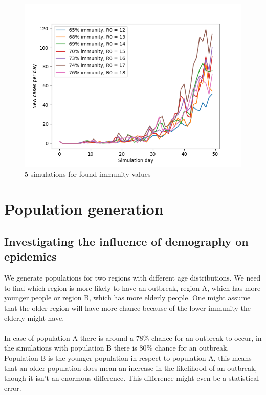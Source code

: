 \documentclass[runningheads]{llncs}
\begin{document}
\begin{figure}
	\includegraphics[width=\textwidth]{test_R0_final.png}
	\caption{5 simulations for found immunity values} 
\end{figure}

\newpage
\noindent
\section{Population generation}

\subsection{Investigating the influence of demography on epidemics}
We generate populations for two regions with different age distributions. We need to find which region is more likely to have an outbreak, region A, which has more younger people or region B, which has more elderly people. One might assume that the older region will have more chance because of the lower immunity the elderly might have.
\\
\\
\noindent
In case of population A there is around a 78\% chance for an outbreak to occur, in the simulations with population B there is 80\% chance for an outbreak. Population B is the younger population in respect to population A, this means that an older population does mean an increase in the likelihood of an outbreak, though it isn't an enormous difference. This difference might even be a statistical error.
\end{document}
